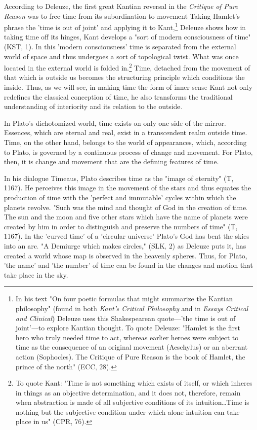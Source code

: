 According to Deleuze, the first great Kantian reversal in the \textit{Critique of Pure Reason} was to free time from its subordination to movement Taking Hamlet's phrase the 'time is out of joint' and applying it to Kant,\footnote{In his text "On four poetic formulas that might summarize the Kantian philosophy" (found in both \textit{Kant's Critical Philosophy} and in \textit{Essays Critical and Clinical}) Deleuze uses this Shakespearean quote---'the time is out of joint'---to explore Kantian thought. To quote Deleuze: "Hamlet is the first hero who truly needed time to act, whereas earlier heroes were subject to time as the consequence of an original movement (Aeschylus) or an aberrant action (Sophocles). The Critique of Pure Reason is the book of Hamlet, the prince of the north" (ECC, 28).} Deleuze shows how in taking time off its hinges, Kant develops a "sort of modern consciousness of time" (KST, 1). In this 'modern consciousness' time is separated from the external world of space and thus undergoes a sort of  topological twist. What was once located in the external world is folded in.\footnote{To quote Kant: "Time is not something which exists of itself, or which inheres in things as an objective determination, and it does not, therefore, remain when abstraction is made of all subjective conditions of its intuition\dots Time is nothing but the subjective condition under which alone intuition can take place in us" (CPR, 76).} Time, detached from the movement of that which is outside us becomes the structuring principle which conditions the inside. Thus, as we will see, in making time the form of inner sense Kant not only redefines the classical conception of time, he also transforms the traditional understanding of interiority and its relation to the outside. 

In Plato's dichotomized world, time exists on only one side of the mirror. Essences, which are eternal and real, exist in a transcendent realm outside time. Time, on the other hand, belongs to the world of appearances, which, according to Plato, is governed by a continuous process of change and movement. For Plato, then, it is change and movement that are the defining features of time. 

In his dialogue Timeaus, Plato describes time as the "image of eternity" (T, 1167). He perceives this image in the movement of the stars and thus equates the production of time with the 'perfect and immutable' cycles within which the planets revolve. "Such was the mind and thought of God in the creation of time. The sun and the moon and five other stars which have the name of planets were created by him in order to distinguish and preserve the numbers of time" (T, 1167). In the 'curved time' of a 'circular universe' Plato's God has bent the skies into an arc. "A Demiurge which makes  circles," (SLK, 2) as Deleuze puts it, has created a world whose map is observed in the heavenly spheres. Thus, for Plato, 'the name' and 'the number' of time can be found in the changes and motion that take place in the sky. 

